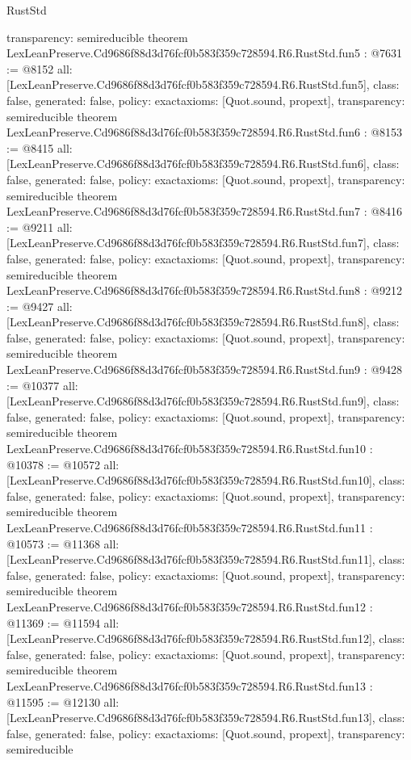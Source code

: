 \begin{lexlean}{RustStd}
\begin{coremodule}
{  transparency: semireducible
}
theorem LexLeanPreserve.Cd9686f88d3d76fcf0b583f359c728594.R6.RustStd.fun5 : @7631 := @8152 {
  all: [LexLeanPreserve.Cd9686f88d3d76fcf0b583f359c728594.R6.RustStd.fun5],
  class: false,
  generated: false,
  policy: exact{axioms: [Quot.sound, propext]},
  transparency: semireducible
}
theorem LexLeanPreserve.Cd9686f88d3d76fcf0b583f359c728594.R6.RustStd.fun6 : @8153 := @8415 {
  all: [LexLeanPreserve.Cd9686f88d3d76fcf0b583f359c728594.R6.RustStd.fun6],
  class: false,
  generated: false,
  policy: exact{axioms: [Quot.sound, propext]},
  transparency: semireducible
}
theorem LexLeanPreserve.Cd9686f88d3d76fcf0b583f359c728594.R6.RustStd.fun7 : @8416 := @9211 {
  all: [LexLeanPreserve.Cd9686f88d3d76fcf0b583f359c728594.R6.RustStd.fun7],
  class: false,
  generated: false,
  policy: exact{axioms: [Quot.sound, propext]},
  transparency: semireducible
}
theorem LexLeanPreserve.Cd9686f88d3d76fcf0b583f359c728594.R6.RustStd.fun8 : @9212 := @9427 {
  all: [LexLeanPreserve.Cd9686f88d3d76fcf0b583f359c728594.R6.RustStd.fun8],
  class: false,
  generated: false,
  policy: exact{axioms: [Quot.sound, propext]},
  transparency: semireducible
}
theorem LexLeanPreserve.Cd9686f88d3d76fcf0b583f359c728594.R6.RustStd.fun9 : @9428 := @10377 {
  all: [LexLeanPreserve.Cd9686f88d3d76fcf0b583f359c728594.R6.RustStd.fun9],
  class: false,
  generated: false,
  policy: exact{axioms: [Quot.sound, propext]},
  transparency: semireducible
}
theorem LexLeanPreserve.Cd9686f88d3d76fcf0b583f359c728594.R6.RustStd.fun10 : @10378 := @10572 {
  all: [LexLeanPreserve.Cd9686f88d3d76fcf0b583f359c728594.R6.RustStd.fun10],
  class: false,
  generated: false,
  policy: exact{axioms: [Quot.sound, propext]},
  transparency: semireducible
}
theorem LexLeanPreserve.Cd9686f88d3d76fcf0b583f359c728594.R6.RustStd.fun11 : @10573 := @11368 {
  all: [LexLeanPreserve.Cd9686f88d3d76fcf0b583f359c728594.R6.RustStd.fun11],
  class: false,
  generated: false,
  policy: exact{axioms: [Quot.sound, propext]},
  transparency: semireducible
}
theorem LexLeanPreserve.Cd9686f88d3d76fcf0b583f359c728594.R6.RustStd.fun12 : @11369 := @11594 {
  all: [LexLeanPreserve.Cd9686f88d3d76fcf0b583f359c728594.R6.RustStd.fun12],
  class: false,
  generated: false,
  policy: exact{axioms: [Quot.sound, propext]},
  transparency: semireducible
}
theorem LexLeanPreserve.Cd9686f88d3d76fcf0b583f359c728594.R6.RustStd.fun13 : @11595 := @12130 {
  all: [LexLeanPreserve.Cd9686f88d3d76fcf0b583f359c728594.R6.RustStd.fun13],
  class: false,
  generated: false,
  policy: exact{axioms: [Quot.sound, propext]},
  transparency: semireducible
}
\end{coremodule}
\end{lexlean}
